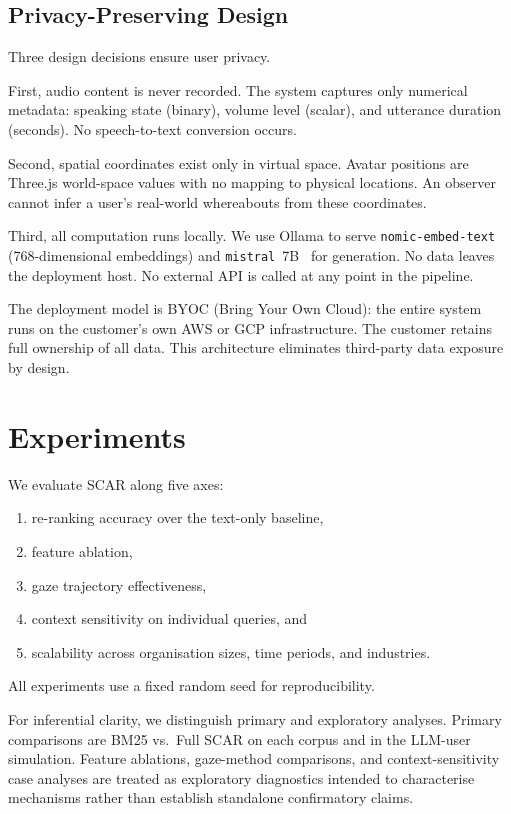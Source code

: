 \documentclass[journal]{IEEEtran}
\begin{document}
\subsection{Privacy-Preserving Design}
\label{ssec:privacy}

Three design decisions ensure user privacy.

First, audio content is never recorded.  The system captures only
numerical metadata: speaking state (binary), volume level (scalar),
and utterance duration (seconds).  No speech-to-text conversion
occurs.

Second, spatial coordinates exist only in virtual space.  Avatar
positions are Three.js world-space values with no mapping to physical
locations.  An observer cannot infer a user's real-world whereabouts
from these coordinates.

Third, all computation runs locally.  We use Ollama to serve
\texttt{nomic-embed-text} (768-dimensional embeddings) and
\texttt{mistral}~7B~\cite{mistral} for generation.  No
data leaves the deployment host.  No external API is called at any
point in the pipeline.

The deployment model is BYOC (Bring Your Own Cloud): the entire
system runs on the customer's own AWS or GCP infrastructure.  The
customer retains full ownership of all data.  This architecture
eliminates third-party data exposure by design.

\section{Experiments}
\label{sec:experiments}

We evaluate SCAR along five axes:
\begin{enumerate}
  \item re-ranking accuracy over the text-only baseline,
  \item feature ablation,
  \item gaze trajectory effectiveness,
  \item context sensitivity on individual queries, and
  \item scalability across organisation sizes, time periods, and industries.
\end{enumerate}
All experiments use a fixed random seed for reproducibility.

For inferential clarity, we distinguish primary and exploratory
analyses. Primary comparisons are BM25 vs.\ Full SCAR on each corpus
and in the LLM-user simulation. Feature ablations, gaze-method
comparisons, and context-sensitivity case analyses are treated as
exploratory diagnostics intended to characterise mechanisms rather
than establish standalone confirmatory claims.
\end{document}
